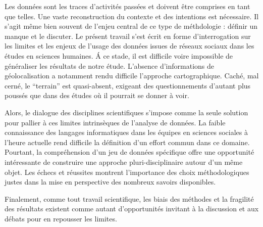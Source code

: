 Les données sont les traces d{\textquoteright}activités passées et doivent être comprises en tant que telles. Une vaste reconstruction du contexte et des intentions est nécessaire. Il s'agit même bien souvent de l'enjeu central de ce type de méthdologie : définir un manque et le discuter. Le présent travail s'est écrit en forme d'interrogation sur les limites et les enjeux de l'usage des données issues de réseaux sociaux dans les études en sciences humaines. \'A ce stade, il est difficile voire impossible de généraliser les résultats de notre étude. L'absence d'informations de géolocalisation a notamment rendu difficile l'approche cartographique. Caché, mal cerné, le ``terrain'' est quasi-absent, exigeant des questionnements d'autant plus poussés que dans des études où il pourrait se donner à voir. 

Alors, le dialogue des disciplines scientifiques s'impose comme la seule solution pour pallier à ces limites intrinsèques de l'analyse de données. La faible connaissance des langages informatiques dans les équipes en sciences sociales à l'heure actuelle \citep{Wieviorka2013} rend difficile la définition d'un effort commun dans ce domaine. Pourtant, la compréhension d'un jeu de données spécifique offre une opportunité intéressante de construire une approche pluri-disciplinaire autour d'un même objet. Les \'echecs et réussites montrent l'importance des choix méthodologiques justes dans la mise en perspective des nombreux savoirs disponibles.


Finalement, comme tout travail scientifique, les biais des méthodes et la fragilité des résultats existent comme autant d'opportunités invitant à la discussion et aux débats pour en repousser les limites.

